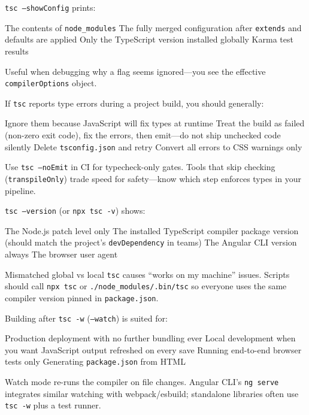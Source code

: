 \question[4]
\texttt{tsc --showConfig} prints:
\begin{choices}
  \choice The contents of \texttt{node\_modules}
  \CorrectChoice The fully merged configuration after \texttt{extends} and defaults are applied
  \choice Only the TypeScript version installed globally
  \choice Karma test results
\end{choices}
\begin{solution}
  Useful when debugging why a flag seems ignored---you see the effective \texttt{compilerOptions} object.
\end{solution}

\question[4]
If \texttt{tsc} reports type errors during a project build, you should generally:
\begin{choices}
  \choice Ignore them because JavaScript will fix types at runtime
  \CorrectChoice Treat the build as failed (non-zero exit code), fix the errors, then emit---do not ship unchecked code silently
  \choice Delete \texttt{tsconfig.json} and retry
  \choice Convert all errors to CSS warnings only
\end{choices}
\begin{solution}
  Use \texttt{tsc --noEmit} in CI for typecheck-only gates. Tools that skip checking (\texttt{transpileOnly}) trade speed for safety---know which step enforces types in your pipeline.
\end{solution}

\question[4]
\texttt{tsc --version} (or \texttt{npx tsc -v}) shows:
\begin{choices}
  \choice The Node.js patch level only
  \CorrectChoice The installed TypeScript compiler package version (should match the project's \texttt{devDependency} in teams)
  \choice The Angular CLI version always
  \choice The browser user agent
\end{choices}
\begin{solution}
  Mismatched global vs local \texttt{tsc} causes ``works on my machine'' issues. Scripts should call \texttt{npx tsc} or \texttt{./node\_modules/.bin/tsc} so everyone uses the same compiler version pinned in \texttt{package.json}.
\end{solution}

\question[4]
Building after \texttt{tsc -w} (\texttt{--watch}) is suited for:
\begin{choices}
  \choice Production deployment with no further bundling ever
  \CorrectChoice Local development when you want JavaScript output refreshed on every save
  \choice Running end-to-end browser tests only
  \choice Generating \texttt{package.json} from HTML
\end{choices}
\begin{solution}
  Watch mode re-runs the compiler on file changes. Angular CLI's \texttt{ng serve} integrates similar watching with webpack/esbuild; standalone libraries often use \texttt{tsc -w} plus a test runner.
\end{solution}

